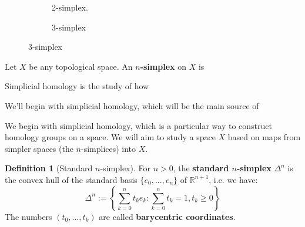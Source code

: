 \documentclass[12pt, oneside]{article}   	%
\theoremstyle{definition}
\newtheorem{definition}{Definition}[section]
\begin{document}
\begin{figure}[!t]
\begin{subfigure}[t]{0.3\textwidth}
\centering
{} 
    \caption{2-simplex.}
\end{subfigure}
\centering
\begin{subfigure}[t]{0.3\textwidth}
\centering
 \caption{3-simplex}
\end{subfigure}

\end{figure}

Let $X$ be any topological space. An \textbf{$n$-simplex} on $X$ is 

Simplicial homology is the study of how 

We'll begin with simplicial homology, which will be the main source of 

We begin with simplicial homology, which is a particular way to construct homology groups on a space. We 
will aim to study a space $X$ based on maps from simpler spaces (the $n$-simplices) into $X$.

\begin{definition}[Standard $n$-simplex]
	For $n > 0$, the \textbf{standard $n$-simplex} $\Delta^n$ is the convex hull of the standard basis 
	$\{e_0, ..., e_n\}$ of $\mathbb R^{n + 1}$, i.e. we have:
	\begin{equation}
		\Delta^n := \left\{\sum_{k = 0}^n t_k e_k : \sum_{k = 0}^n t_k = 1, t_k\geq 0\right\}
	\end{equation}
	The numbers $(t_0, ..., t_k)$ are called \textbf{barycentric coordinates}. 
\end{definition}
\end{document}
